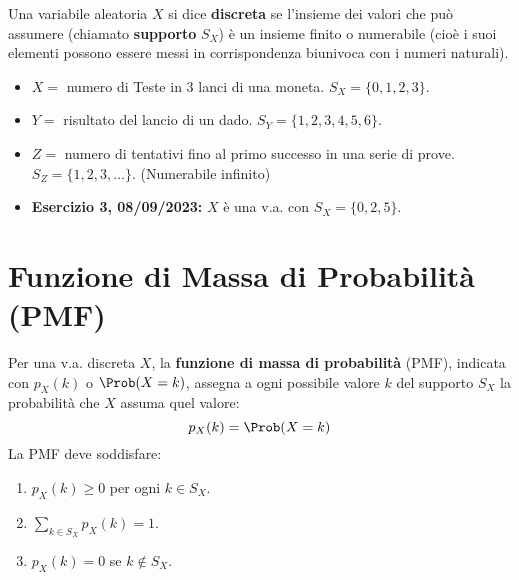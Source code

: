 \begin{definition}
Una variabile aleatoria $X$ si dice \textbf{discreta} se l'insieme dei valori che può assumere (chiamato \textbf{supporto} $S_X$) è un insieme finito o numerabile (cioè i suoi elementi possono essere messi in corrispondenza biunivoca con i numeri naturali).
\end{definition}

\begin{example}
\begin{itemize}
    \item $X = $ numero di Teste in 3 lanci di una moneta. $S_X = \{0, 1, 2, 3\}$.
    \item $Y = $ risultato del lancio di un dado. $S_Y = \{1, 2, 3, 4, 5, 6\}$.
    \item $Z = $ numero di tentativi fino al primo successo in una serie di prove. $S_Z = \{1, 2, 3, \dots\}$. (Numerabile infinito)
    \item \textbf{Esercizio 3, 08/09/2023:} $X$ è una v.a. con $S_X = \{0, 2, 5\}$.
\end{itemize}
\end{example}

\section{Funzione di Massa di Probabilità (PMF)}
\begin{definition}
Per una v.a. discreta $X$, la \textbf{funzione di massa di probabilità} (PMF), indicata con $p_X(k)$ o $\Prob(X=k)$, assegna a ogni possibile valore $k$ del supporto $S_X$ la probabilità che $X$ assuma quel valore:
\[ p_X(k) = \Prob(X=k) \]
La PMF deve soddisfare:
\begin{enumerate}
    \item $p_X(k) \ge 0$ per ogni $k \in S_X$.
    \item $\sum_{k \in S_X} p_X(k) = 1$.
    \item $p_X(k) = 0$ se $k \notin S_X$.
\end{enumerate}
\end{definition}

